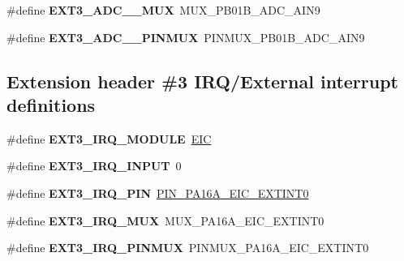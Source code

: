 \begin{DoxyCompactItemize}
\item 
\hypertarget{group__saml21__xplained__pro__features__group_gab517825e26b66dd5e8a496254d1ff476}{}\#define {\bfseries E\+X\+T3\+\_\+\+A\+D\+C\+\_\+\_\+\+M\+U\+X}~M\+U\+X\+\_\+\+P\+B01\+B\+\_\+\+A\+D\+C\+\_\+\+A\+I\+N9\label{group__saml21__xplained__pro__features__group_gab517825e26b66dd5e8a496254d1ff476}

\item 
\hypertarget{group__saml21__xplained__pro__features__group_ga452a453e54d6ebe5f16fa57830febbe1}{}\#define {\bfseries E\+X\+T3\+\_\+\+A\+D\+C\+\_\+\_\+\+P\+I\+N\+M\+U\+X}~P\+I\+N\+M\+U\+X\+\_\+\+P\+B01\+B\+\_\+\+A\+D\+C\+\_\+\+A\+I\+N9\label{group__saml21__xplained__pro__features__group_ga452a453e54d6ebe5f16fa57830febbe1}

\end{DoxyCompactItemize}
\subsection*{Extension header \#3 I\+R\+Q/\+External interrupt definitions}
\begin{DoxyCompactItemize}
\item 
\hypertarget{group__saml21__xplained__pro__features__group_ga5ec11c6d995d6000b5b9d55a7870ef90}{}\#define {\bfseries E\+X\+T3\+\_\+\+I\+R\+Q\+\_\+\+M\+O\+D\+U\+L\+E}~\hyperlink{group___s_a_m_l21_j18_a__base_ga27183a94584b5fca7e1207ce7a79782a}{E\+I\+C}\label{group__saml21__xplained__pro__features__group_ga5ec11c6d995d6000b5b9d55a7870ef90}

\item 
\hypertarget{group__saml21__xplained__pro__features__group_ga8f4548daa660ae56479c9dd4a6dc8a35}{}\#define {\bfseries E\+X\+T3\+\_\+\+I\+R\+Q\+\_\+\+I\+N\+P\+U\+T}~0\label{group__saml21__xplained__pro__features__group_ga8f4548daa660ae56479c9dd4a6dc8a35}

\item 
\hypertarget{group__saml21__xplained__pro__features__group_gab3408928c37ce5e12da13e42f9860ab9}{}\#define {\bfseries E\+X\+T3\+\_\+\+I\+R\+Q\+\_\+\+P\+I\+N}~\hyperlink{pio_2saml21j18a_8h_a0d770aa7d3ddd4cad47c946b1a3da6c9}{P\+I\+N\+\_\+\+P\+A16\+A\+\_\+\+E\+I\+C\+\_\+\+E\+X\+T\+I\+N\+T0}\label{group__saml21__xplained__pro__features__group_gab3408928c37ce5e12da13e42f9860ab9}

\item 
\hypertarget{group__saml21__xplained__pro__features__group_ga153e6ec05a5cc8d79bf49f482df9bcb4}{}\#define {\bfseries E\+X\+T3\+\_\+\+I\+R\+Q\+\_\+\+M\+U\+X}~M\+U\+X\+\_\+\+P\+A16\+A\+\_\+\+E\+I\+C\+\_\+\+E\+X\+T\+I\+N\+T0\label{group__saml21__xplained__pro__features__group_ga153e6ec05a5cc8d79bf49f482df9bcb4}

\item 
\hypertarget{group__saml21__xplained__pro__features__group_ga8706ccc826eb7e13e73095dc982777d8}{}\#define {\bfseries E\+X\+T3\+\_\+\+I\+R\+Q\+\_\+\+P\+I\+N\+M\+U\+X}~P\+I\+N\+M\+U\+X\+\_\+\+P\+A16\+A\+\_\+\+E\+I\+C\+\_\+\+E\+X\+T\+I\+N\+T0\label{group__saml21__xplained__pro__features__group_ga8706ccc826eb7e13e73095dc982777d8}

\end{DoxyCompactItemize}

